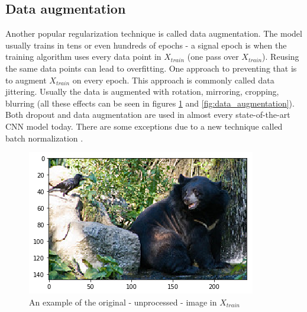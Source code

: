 \documentclass[times, utf8, diplomski]{fer}
\begin{document}
\subsection{Data augmentation}  \label{se:data_augmentation}

Another popular regularization technique is called data augmentation. The model usually trains in tens or even hundreds of epochs - a signal epoch is when the training algorithm uses every data point in $X_{train}$ (one pass over $X_{train}$). Reusing the same data points can lead to overfitting. One approach to preventing that is to augment $X_{train}$ on every epoch. This approach is commonly called data jittering. Usually the data is augmented with rotation, mirroring, cropping, blurring (all these effects can be seen in figures \ref{fig:data_augmentation_figure} and \ref{fig:data_augmentation}). Both dropout and data augmentation are used in almost every state-of-the-art CNN model today. There are some exceptions due to a new technique called batch normalization \citep{ioffe_batch_2015}.

\begin{figure}
  \includegraphics[scale=0.7]{figures/data_augmentation.png}
  \centering
  \caption{An example of the original - unprocessed - image in $X_{train}$}
  \label{fig:data_augmentation_figure}
\end{figure}
\end{document}
